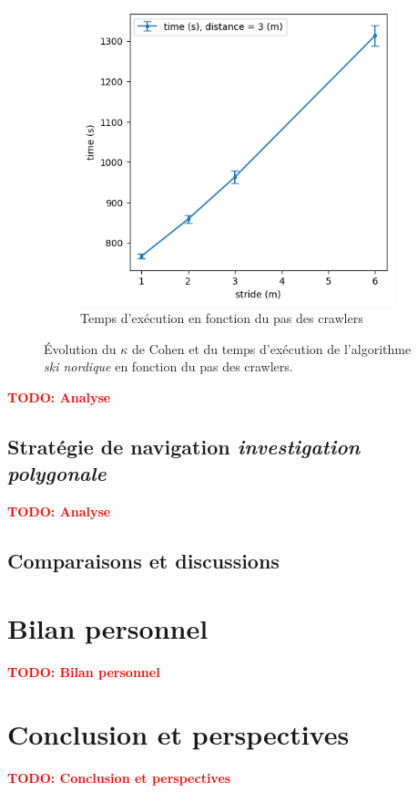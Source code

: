 \documentclass[francais,RandD]{rapportPFE}
\newcommand{\TODO}[1]{\textcolor{red}{\textbf{TODO: #1}}}
\begin{document}
\begin{figure}[h!]
\begin{subfigure}[t]{0.49\linewidth}
						\includegraphics[width=\linewidth]{graphics/ski_nordique-time_vs_stride.png}
						\caption{Temps d'exécution en fonction du pas des crawlers}
						\label{fig:ski_nordique-time_vs_stride}
				\end{subfigure}
				\caption{Évolution du $\kappa$ de Cohen et du temps d'exécution de l'algorithme \textit{ski nordique} en fonction du pas des crawlers.}
				\label{fig:ski_nordique-stride}
			\end{figure}

			\TODO{Analyse}
		\subsection*{Stratégie de navigation \textit{investigation polygonale}}
			\TODO{Analyse}
		\subsection*{Comparaisons et discussions}
	\section{Bilan personnel}
		\TODO{Bilan personnel}
	\section{Conclusion et perspectives}
		\TODO{Conclusion et perspectives}
\end{document}
